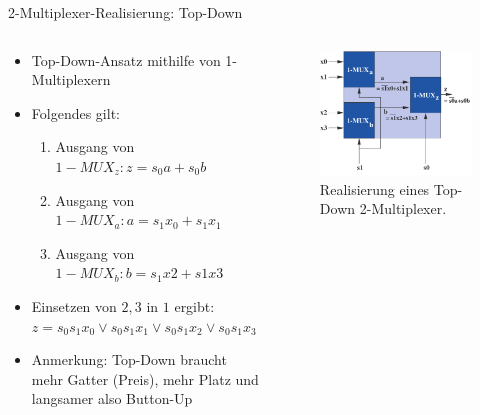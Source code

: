 \documentclass[12pt%
,xcolor=table
,aspectratio=169%
]{beamer}
\begin{document}
\begin{frame}{2-Multiplexer-Realisierung: Top-Down}
\begin{columns}[T] %
\begin{column}{.68\textwidth}
\begin{itemize}
	\item Top-Down-Ansatz mithilfe von 1-Multiplexern
	\item Folgendes gilt:
	\begin{enumerate}
		\item Ausgang von $1-MUX_z : z = s_0 a + s_0 b$
		\item Ausgang von $1-MUX_a : a = s_1 x_0 + s_1 x_1$
		\item Ausgang von $1-MUX_b : b = s_1 x2 + s1 x3$
	\end{enumerate}
	\item Einsetzen von $2,3$ in $1$ ergibt: $z = s_0 s_1 x_0 \lor s_0 s_1 x_1 \lor s_0 s_1 x_2 \lor s_0 s_1 x_3$
	\item Anmerkung: Top-Down braucht mehr Gatter (Preis), mehr Platz und langsamer also Button-Up
\end{itemize}
\end{column}%
\hfill%
\begin{column}{.48\textwidth}
\centering
\begin{figure}
\includegraphics[scale=0.32]{pictures/mux2_td}
\caption{Realisierung eines Top-Down 2-Multiplexer.}
\end{figure}
\end{column}%
\end{columns}
\end{frame}
\end{document}
